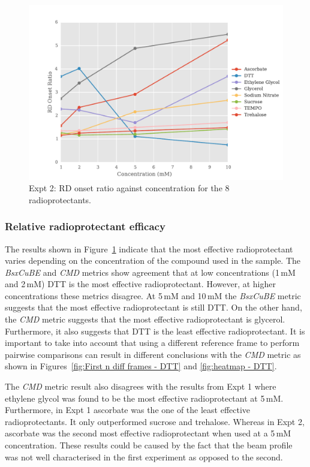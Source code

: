\begin{figure}
    \centering
    \includegraphics[width=1.0\textwidth]{figures/saxs/RatioPlots.pdf}
    \caption[RD onset ratio against concentration for the 8 radioprotectants]{Expt 2: RD onset ratio against concentration for the 8 radioprotectants.}
    \label{fig:SAXS Ratio plot}
\end{figure}

\subsubsection{Relative radioprotectant efficacy}
\label{subs:Relative radioprotectant efficacy}
The results shown in Figure~\ref{fig:SAXS Ratio plot} indicate that the most effective radioprotectant varies depending on the concentration of the compound used in the sample.
The \textit{BsxCuBE} and \textit{CMD} metrics show agreement that at low concentrations (1$\,$mM and 2$\,$mM) DTT is the most effective radioprotectant.
However, at higher concentrations these metrics disagree.
At 5$\,$mM and 10$\,$mM the \textit{BsxCuBE} metric suggests that the most effective radioprotectant is still DTT.
On the other hand, the \textit{CMD} metric suggests that the most effective radioprotectant is glycerol.
Furthermore, it also suggests that DTT is the least effective radioprotectant.
It is important to take into account that using a different reference frame to perform pairwise comparisons can result in different conclusions with the \textit{CMD} metric as shown in Figures~\ref{fig:First n diff frames - DTT} and \ref{fig:heatmap - DTT}.

The \textit{CMD} metric result also disagrees with the results from Expt 1 where ethylene glycol was found to be the most effective radioprotectant at 5$\,$mM.
Furthermore, in Expt 1 ascorbate was the one of the least effective radioprotectants.
It only outperformed sucrose and trehalose.
Whereas in Expt 2, ascorbate was the second most effective radioprotectant when used at a 5$\,$mM concentration.
These results could be caused by the fact that the beam profile was not well characterised in the first experiment as opposed to the second.

